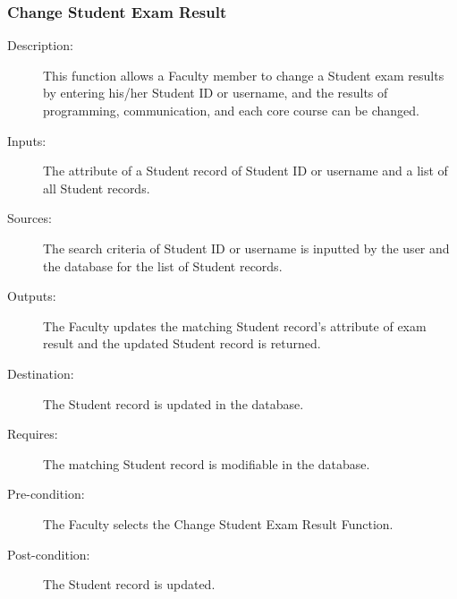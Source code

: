 \subsubsection{\large Change Student Exam Result} 
\begin{boxed} %
\begin{description}
\item[Description:]
   This function allows a Faculty member to change a Student exam results by
   entering his/her Student ID or username, and the results of programming,
   communication, and each core course can be changed.
\item[Inputs:]
   The attribute of a Student record of Student ID or username and a list of all
   Student records.
\item[Sources:]
   The search criteria of Student ID or username is inputted by the user and the
   database for the list of Student records.
\item[Outputs:]
   The Faculty updates the matching Student record's attribute of exam result
   and the updated Student record is returned.
\item[Destination:]
   The Student record is updated in the database.
\item[Requires:]
   The matching Student record is modifiable in the database.
\item[Pre-condition:]
   The Faculty selects the Change Student Exam Result Function.
\item[Post-condition:]
   The Student record is updated.
\end{description}
\end{boxed} %

